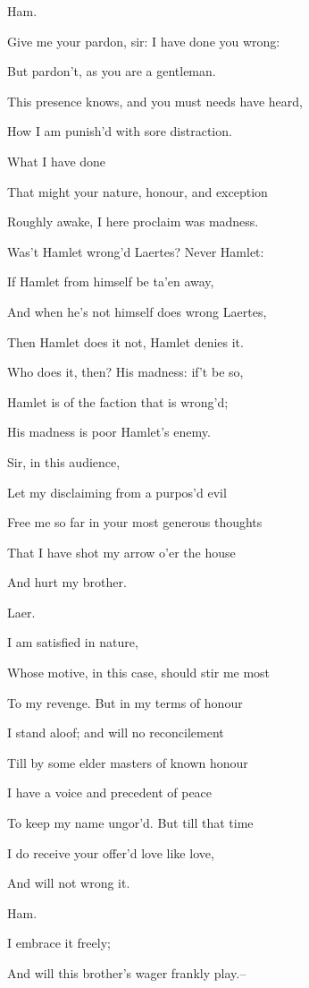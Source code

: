 \documentclass[12pt]{book}
\begin{document}
Ham.

Give me your pardon, sir: I have done you wrong:

But pardon't, as you are a gentleman.

This presence knows, and you must needs have heard,

How I am punish'd with sore distraction.

What I have done

That might your nature, honour, and exception

Roughly awake, I here proclaim was madness.

Was't Hamlet wrong'd Laertes? Never Hamlet:

If Hamlet from himself be ta'en away,

And when he's not himself does wrong Laertes,

Then Hamlet does it not, Hamlet denies it.

Who does it, then? His madness: if't be so,

Hamlet is of the faction that is wrong'd;

His madness is poor Hamlet's enemy.

Sir, in this audience,

Let my disclaiming from a purpos'd evil

Free me so far in your most generous thoughts

That I have shot my arrow o'er the house

And hurt my brother.



Laer.

I am satisfied in nature,

Whose motive, in this case, should stir me most

To my revenge. But in my terms of honour

I stand aloof; and will no reconcilement

Till by some elder masters of known honour

I have a voice and precedent of peace

To keep my name ungor'd. But till that time

I do receive your offer'd love like love,

And will not wrong it.



Ham.

I embrace it freely;

And will this brother's wager frankly play.--
\end{document}
